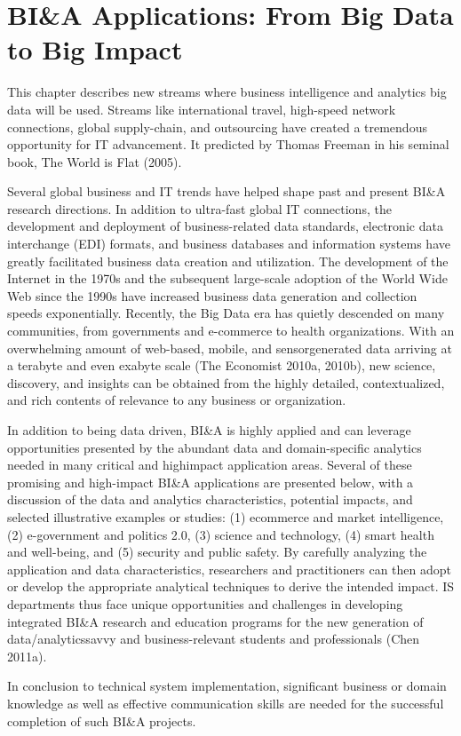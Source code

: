 \section{BI\&A Applications: From Big Data to Big Impact}

This chapter describes new streams where business intelligence and analytics big data will be used. Streams like international travel, high-speed network connections, global supply-chain, and
outsourcing have created a tremendous opportunity for IT
advancement. It predicted by Thomas Freeman in his seminal
book, The World is Flat (2005).

Several global business and IT trends have helped shape past
and present BI\&A research directions. In addition to ultra-fast
global IT connections, the development and deployment of
business-related data standards, electronic data interchange
(EDI) formats, and business databases and information
systems have greatly facilitated business data creation and
utilization. The development of the Internet in the 1970s and
the subsequent large-scale adoption of the World Wide Web
since the 1990s have increased business data generation and
collection speeds exponentially. Recently, the Big Data era
has quietly descended on many communities, from governments
and e-commerce to health organizations. With an
overwhelming amount of web-based, mobile, and sensorgenerated
data arriving at a terabyte and even exabyte scale
(The Economist 2010a, 2010b), new science, discovery, and
insights can be obtained from the highly detailed, contextualized,
and rich contents of relevance to any business or
organization.

In addition to being data driven, BI\&A is highly applied and
can leverage opportunities presented by the abundant data and
domain-specific analytics needed in many critical and highimpact
application areas. Several of these promising and
high-impact BI\&A applications are presented below, with a
discussion of the data and analytics characteristics, potential
impacts, and selected illustrative examples or studies: (1) ecommerce
and market intelligence, (2) e-government and
politics 2.0, (3) science and technology, (4) smart health and
well-being, and (5) security and public safety. By carefully
analyzing the application and data characteristics, researchers
and practitioners can then adopt or develop the appropriate
analytical techniques to derive the intended impact. IS departments thus face unique opportunities and
challenges in developing integrated BI\&A research and
education programs for the new generation of data/analyticssavvy
and business-relevant students and professionals (Chen
2011a).

In conclusion to technical system implementation, significant business
or domain knowledge as well as effective communication
skills are needed for the successful completion of such BI\&A
projects.